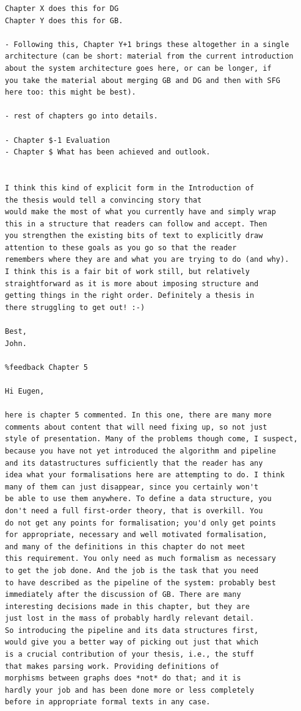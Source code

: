\begin{Verbatim}
Chapter X does this for DG
Chapter Y does this for GB.

- Following this, Chapter Y+1 brings these altogether in a single
architecture (can be short: material from the current introduction
about the system architecture goes here, or can be longer, if
you take the material about merging GB and DG and then with SFG
here too: this might be best).

- rest of chapters go into details.

- Chapter $-1 Evaluation
- Chapter $ What has been achieved and outlook.


I think this kind of explicit form in the Introduction of
the thesis would tell a convincing story that
would make the most of what you currently have and simply wrap
this in a structure that readers can follow and accept. Then
you strengthen the existing bits of text to explicitly draw
attention to these goals as you go so that the reader
remembers where they are and what you are trying to do (and why).
I think this is a fair bit of work still, but relatively
straightforward as it is more about imposing structure and
getting things in the right order. Definitely a thesis in
there struggling to get out! :-)

Best,
John.

%feedback Chapter 5

Hi Eugen,

here is chapter 5 commented. In this one, there are many more
comments about content that will need fixing up, so not just
style of presentation. Many of the problems though come, I suspect,
because you have not yet introduced the algorithm and pipeline
and its datastructures sufficiently that the reader has any
idea what your formalisations here are attempting to do. I think
many of them can just disappear, since you certainly won't
be able to use them anywhere. To define a data structure, you
don't need a full first-order theory, that is overkill. You
do not get any points for formalisation; you'd only get points
for appropriate, necessary and well motivated formalisation,
and many of the definitions in this chapter do not meet
this requirement. You only need as much formalism as necessary
to get the job done. And the job is the task that you need
to have described as the pipeline of the system: probably best
immediately after the discussion of GB. There are many
interesting decisions made in this chapter, but they are
just lost in the mass of probably hardly relevant detail.
So introducing the pipeline and its data structures first,
would give you a better way of picking out just that which
is a crucial contribution of your thesis, i.e., the stuff
that makes parsing work. Providing definitions of
morphisms between graphs does *not* do that; and it is
hardly your job and has been done more or less completely
before in appropriate formal texts in any case.


\end{Verbatim}
